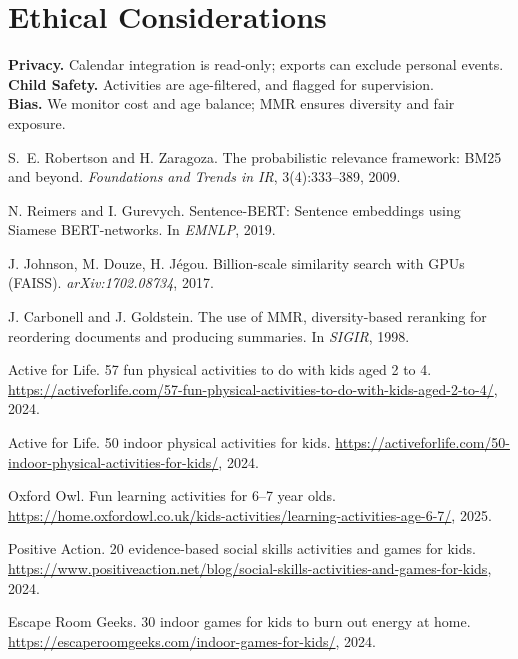 \documentclass[final]{article}
\begin{document}
\section*{Ethical Considerations}
\textbf{Privacy.} Calendar integration is read-only; exports can exclude personal events.  \\
\textbf{Child Safety.} Activities are age-filtered, and flagged for supervision.  \\
\textbf{Bias.} We monitor cost and age balance; MMR ensures diversity and fair exposure.  

{\small
\begin{thebibliography}{9}\setlength{\itemsep}{2pt}

S.~E. Robertson and H. Zaragoza.
The probabilistic relevance framework: BM25 and beyond.
\emph{Foundations and Trends in IR}, 3(4):333--389, 2009.

N. Reimers and I. Gurevych.
Sentence-BERT: Sentence embeddings using Siamese BERT-networks.
In \emph{EMNLP}, 2019.

J. Johnson, M. Douze, H. Jégou.
Billion-scale similarity search with GPUs (FAISS).
\emph{arXiv:1702.08734}, 2017.

J. Carbonell and J. Goldstein.
The use of MMR, diversity-based reranking for reordering documents and producing summaries.
In \emph{SIGIR}, 1998.

Active for Life.
57 fun physical activities to do with kids aged 2 to 4.
\url{https://activeforlife.com/57-fun-physical-activities-to-do-with-kids-aged-2-to-4/}, 2024.

Active for Life.
50 indoor physical activities for kids.
\url{https://activeforlife.com/50-indoor-physical-activities-for-kids/}, 2024.

Oxford Owl.
Fun learning activities for 6--7 year olds.
\url{https://home.oxfordowl.co.uk/kids-activities/learning-activities-age-6-7/}, 2025.

Positive Action.
20 evidence-based social skills activities and games for kids.
\url{https://www.positiveaction.net/blog/social-skills-activities-and-games-for-kids}, 2024.

Escape Room Geeks.
30 indoor games for kids to burn out energy at home.
\url{https://escaperoomgeeks.com/indoor-games-for-kids/}, 2024.

\end{thebibliography}
}
\end{document}
